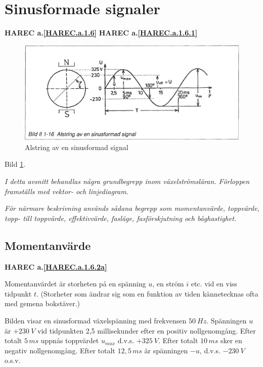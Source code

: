 \section{Sinusformade signaler}
\textbf{HAREC a.\ref{HAREC.a.1.6}\label{myHAREC.a.1.6}}
\textbf{HAREC a.\ref{HAREC.a.1.6.1}\label{myHAREC.a.1.6.1}}

\begin{figure}[h]
\includegraphics[width=\textwidth]{images/bild_2_1-16}
\caption{Alstring av en sinusformad signal}
\label{fig:BildII1-16}
\end{figure}

Bild \ref{fig:BildII1-16}.

\emph{I detta avsnitt behandlas några grundbegrepp inom växelströmsläran.
Förloppen framställs med vektor- och linjediagram.}

\emph{För närmare beskrivning används sådana begrepp som momentanvärde,
toppvärde, topp- till toppvärde, effektivvärde, fasläge, fasförskjutning och
båghastighet.}

\subsection{Momentanvärde}
\textbf{HAREC a.\ref{HAREC.a.1.6.2a}\label{myHAREC.a.1.6.2a}}

Momentanvärdet är storheten på en spänning \(u\), en ström \(i\) etc. vid en
viss tidpunkt \(t\). (Storheter som ändrar sig som en funktion av tiden
kännetecknas ofta med gemena bokstäver.)

Bilden visar en sinusformad växelspänning med frekvensen \(50\ Hz\). Spänningen
\(u\) är \(+230\ V\) vid tidpunkten 2,5 millisekunder efter en positiv
nollgenomgång. Efter totalt \(5\, ms\) uppnås toppvärdet \(u_{max}\) d.v.s.
\(+325\ V\). Efter totalt \(10\, ms\) sker en negativ nollgenomgång. Efter
totalt \(12,5\, ms\) är spänningen \(-u\), d.v.s. \(-230\ V\) o.s.v.

